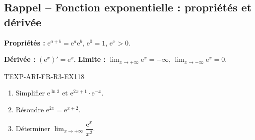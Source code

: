 

\subsection*{Rappel -- Fonction exponentielle : propriétés et dérivée}

\textbf{Propriétés :} $\mathrm{e}^{a+b} = \mathrm{e}^a \mathrm{e}^b$, $\mathrm{e}^0 = 1$, $\mathrm{e}^x > 0$.

\textbf{Dérivée :} $(\mathrm{e}^x)' = \mathrm{e}^x$. \textbf{Limite :} $\lim_{x \to +\infty} \mathrm{e}^x = +\infty$, $\lim_{x \to -\infty} \mathrm{e}^x = 0$.

\begin{exercice}{TEXP-ARI-FR-R3-EX1}{1}{8}
\begin{enumerate}
  \item Simplifier $\mathrm{e}^{\ln 3}$ et $\mathrm{e}^{2x + 1} \cdot \mathrm{e}^{-x}$.
  \item Résoudre $\mathrm{e}^{2x} = \mathrm{e}^{x+2}$.
  \item Déterminer $\lim_{x \to +\infty} \dfrac{\mathrm{e}^x}{x^2}$.
\end{enumerate}
\end{exercice}

